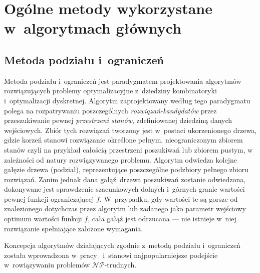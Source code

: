 \section{Ogólne metody wykorzystane w~algorytmach głównych}\label{s_methods}

\subsection{Metoda podziału i~ograniczeń}\label{ss_branch_and_bound}
\par{
  Metoda podziału i~ograniczeń jest paradygmatem projektowania algorytmów rozwiązujących problemy optymalizacyjne z~dziedziny kombinatoryki i~optymalizacji dyskretnej.
  Algorytm zaprojektowany według tego paradygmatu polega na rozpatrywaniu poszczególnych \emph{rozwiązań-kandydatów} przez przeszukiwanie pewnej \emph{przestrzeni stanów}, zdefiniowanej dziedziną danych wejściowych.
  Zbiór tych rozwiązań tworzony jest w~postaci ukorzenionego drzewa, gdzie korzeń stanowi rozwiązanie określone pełnym, nieograniczonym zbiorem stanów czyli na przykład całością przestrzeni poszukiwań lub zbiorem pustym, w zależności od natury rozwiązywanego problemu.
  Algorytm odwiedza kolejne gałęzie drzewa (podział), reprezentujące poszczególne
  podzbiory pełnego zbioru rozwiązań.
  Zanim jednak dana gałąź~drzewa poszukiwań zostanie odwiedzona, dokonywane jest sprawdzenie szacunkowych dolnych i~górnych granic wartości pewnej funkcji ograniczającej $f$.
  W~przypadku, gdy wartości te są gorsze od znalezionego dotychczas przez algorytm lub zadanego jako parametr wejściowy optimum wartości funkcji $f$, cała gałąź jest odrzucana --- nie istnieje w~niej rozwiązanie spełniające założone wymagania.
}
\par{
  Koncepcja algorytmów działających zgodnie z~metodą podziału i~ograniczeń została wprowadzona w~pracy~\cite{land60} i~stanowi najpopularniejsze podejście w~rowiązywaniu problemów $\mathcal{NP}$-trudnych.
}
